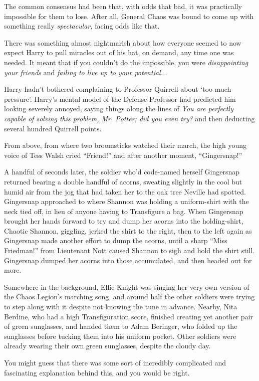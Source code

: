 The common consensus had been that, with odds that bad, it was
practically impossible for them to lose. After all, General Chaos was
bound to come up with something really \emph{spectacular,} facing odds
like that.

There was something almost nightmarish about how everyone seemed to now
expect Harry to pull miracles out of his hat, on demand, any time one
was needed. It meant that if you couldn't do the impossible, you were
\emph{disappointing your friends} and \emph{failing to live up to your
potential...}

Harry hadn't bothered complaining to Professor Quirrell about `too much
pressure'. Harry's mental model of the Defense Professor had predicted
him looking severely annoyed, saying things along the lines of \emph{You
are perfectly capable of solving this problem, Mr. Potter; did you even
try?} and then deducting several hundred Quirrell points.

From above, from where two broomsticks watched their march, the high
young voice of Tess Walsh cried ``Friend!'' and after another moment,
``Gingersnap!''

A handful of seconds later, the soldier who'd code-named herself
Gingersnap returned bearing a double handful of acorns, sweating
slightly in the cool but humid air from the jog that had taken her to
the oak tree Neville had spotted. Gingersnap approached to where Shannon
was holding a uniform-shirt with the neck tied off, in lieu of anyone
having to Transfigure a bag. When Gingersnap brought her hands forward
to try and dump her acorns into the holding-shirt, Chaotic Shannon,
giggling, jerked the shirt to the right, then to the left again as
Gingersnap made another effort to dump the acorns, until a sharp ``Miss
Friedman!'' from Lieutenant Nott caused Shannon to sigh and hold the
shirt still. Gingersnap dumped her acorns into those accumulated, and
then headed out for more.

Somewhere in the background, Ellie Knight was singing her very own
version of the Chaos Legion's marching song, and around half the other
soldiers were trying to step along with it despite not knowing the tune
in advance. Nearby, Nita Berdine, who had a high Transfiguration score,
finished creating yet another pair of green sunglasses, and handed them
to Adam Beringer, who folded up the sunglasses before tucking them into
his uniform pocket. Other soldiers were already wearing their own green
sunglasses, despite the cloudy day.

You might guess that there was some sort of incredibly complicated and
fascinating explanation behind this, and you would be right.

